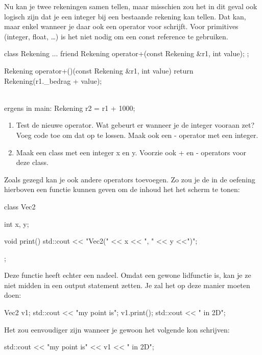 \documentclass[11pt, oldfontcommands, oneside, a4paper]{memoir}
\begin{document}
Nu kan je twee rekeningen samen tellen, maar misschien zou het in dit geval ook logisch zijn dat je een integer bij een bestaande rekening kan tellen. Dat kan, maar enkel wanneer je daar ook een operator voor schrijft. Voor primitives (integer, float, \ldots) is het niet nodig om een const reference te gebruiken.

\begin{code}
class Rekening {
  ...
  friend Rekening operator+(const Rekening &r1, int value);
};

Rekening operator+()(const Rekening &r1, int value) {
  return Rekening(r1._bedrag + value);
} 

\\ ergens in main:
Rekening r2 = r1 + 1000;

\end{code}

\begin{exercise}
  \begin{enumerate}
    \item Test de nieuwe operator. Wat gebeurt er wanneer je de integer vooraan zet? Voeg code toe om dat op te lossen. Maak ook een - operator met een integer.

    \item Maak een class  met een integer x en y. Voorzie ook + en - operators voor deze class.
  \end{enumerate}
\end{exercise}

Zoals gezegd kan je ook andere operators toevoegen. Zo zou je de  in de oefening hierboven een functie kunnen geven om de inhoud het het scherm te tonen:

\begin{code}
class Vec2 {
  int x, y;

  void print() {
    std::cout << "Vec2(" << x << ", " << y <<")";
  }
};
\end{code}

Deze functie heeft echter een nadeel. Omdat  een gewone lidfunctie is, kan je ze niet midden in een output statement zetten. Je zal het op deze manier moeten doen:

\begin{code}
Vec2 v1;
std::cout << "my point is";
v1.print();
std::cout << " in 2D";
\end{code}

Het zou eenvoudiger zijn wanneer je gewoon het volgende kon schrijven:

\begin{code}
std::cout << "my point is" << v1 << " in 2D";
\end{code}
\end{document}
